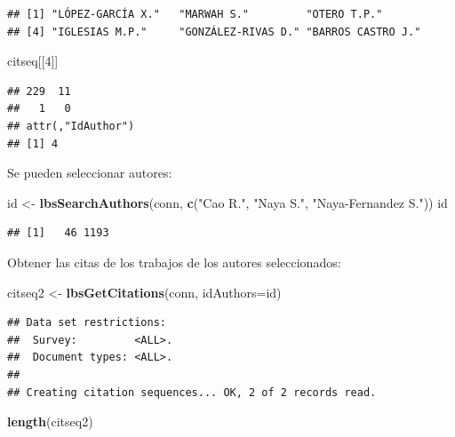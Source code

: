 \documentclass[]{book}
\newenvironment{Shaded}{\begin{snugshade}}{\end{snugshade}}
\newcommand{\DataTypeTok}[1]{\textcolor[rgb]{0.13,0.29,0.53}{#1}}
\newcommand{\DecValTok}[1]{\textcolor[rgb]{0.00,0.00,0.81}{#1}}
\newcommand{\KeywordTok}[1]{\textcolor[rgb]{0.13,0.29,0.53}{\textbf{#1}}}
\newcommand{\NormalTok}[1]{#1}
\newcommand{\StringTok}[1]{\textcolor[rgb]{0.31,0.60,0.02}{#1}}
\begin{document}
\begin{verbatim}
## [1] "LÓPEZ-GARCÍA X."   "MARWAH S."         "OTERO T.P."       
## [4] "IGLESIAS M.P."     "GONZÁLEZ-RIVAS D." "BARROS CASTRO J."
\end{verbatim}

\begin{Shaded}
\begin{Highlighting}[]
\NormalTok{citseq[[}\DecValTok{4}\NormalTok{]]}
\end{Highlighting}
\end{Shaded}

\begin{verbatim}
## 229  11 
##   1   0 
## attr(,"IdAuthor")
## [1] 4
\end{verbatim}

Se pueden seleccionar autores:

\begin{Shaded}
\begin{Highlighting}[]
\NormalTok{id <-}\StringTok{ }\KeywordTok{lbsSearchAuthors}\NormalTok{(conn, }\KeywordTok{c}\NormalTok{(}\StringTok{"Cao R."}\NormalTok{, }\StringTok{"Naya S."}\NormalTok{, }\StringTok{"Naya-Fernandez S."}\NormalTok{))}
\NormalTok{id}
\end{Highlighting}
\end{Shaded}

\begin{verbatim}
## [1]   46 1193
\end{verbatim}

Obtener las citas de los trabajos de los autores seleccionados:

\begin{Shaded}
\begin{Highlighting}[]
\NormalTok{citseq2 <-}\StringTok{ }\KeywordTok{lbsGetCitations}\NormalTok{(conn, }\DataTypeTok{idAuthors=}\NormalTok{id)}
\end{Highlighting}
\end{Shaded}

\begin{verbatim}
## Data set restrictions:
##  Survey:         <ALL>.
##  Document types: <ALL>.
## 
## Creating citation sequences... OK, 2 of 2 records read.
\end{verbatim}

\begin{Shaded}
\begin{Highlighting}[]
\KeywordTok{length}\NormalTok{(citseq2)}
\end{Highlighting}
\end{Shaded}
\end{document}
